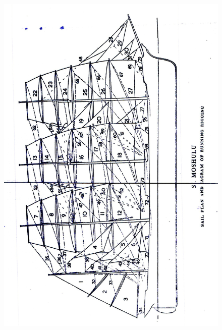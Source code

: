 \documentclass[
  11pt,
  msmallroyalvopaper
]{memoir}
\begin{document}
\begin{figure}
\centering
\includegraphics{./images/rigging1.jpg}
\end{figure}
\end{document}
